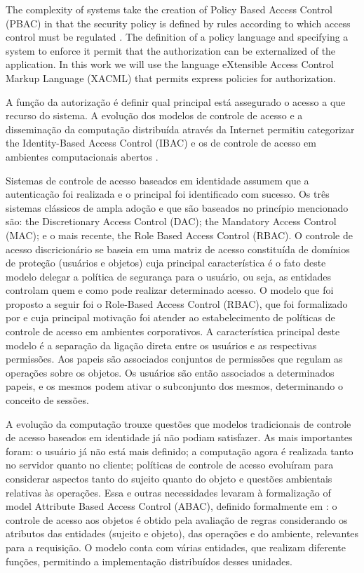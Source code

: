 \documentclass{doublecol-new}
\begin{document}
The complexity of systems take the creation of Policy Based Access Control (PBAC) in that the security policy is defined by rules according to which access control must be regulated \citep{samarati2001access}. The definition of a policy language and specifying a system to enforce it permit that the authorization can be externalized of the application. In this work we will use the language eXtensible Access Control Markup Language (XACML)\cite{rissanen2013extensible} that permits express policies for authorization.

A função da autorização é definir qual principal está assegurado o acesso a que recurso do sistema. A evolução dos modelos de controle de acesso e a disseminação da computação distribuída através da Internet permitiu categorizar the Identity-Based Access Control (IBAC) e os de controle de acesso em ambientes computacionais abertos \cite{gollmann2011compsecurity}.

Sistemas de controle de acesso baseados em identidade assumem que a autenticação foi realizada e o principal foi identificado com sucesso. Os três sistemas clássicos de ampla adoção e que são baseados no princípio mencionado são: the Discretionary Access Control (DAC); the Mandatory Access Control (MAC); e o mais recente, the Role Based Access Control (RBAC). O controle de acesso discricionário \cite{lampson1974protection} se baseia em uma matriz de acesso constituída de domínios de proteção (usuários e objetos) cuja principal característica é o fato deste modelo delegar a política de segurança para o usuário, ou seja, as entidades controlam quem e como pode realizar determinado acesso. O modelo que foi proposto a seguir foi o Role-Based Access Control (RBAC), que foi formalizado por \cite{ferraiolo1992role} e cuja principal motivação foi atender ao estabelecimento de políticas de controle de acesso em ambientes corporativos. A característica principal deste modelo é a separação da ligação direta entre os usuários e as respectivas permissões. Aos papeis são associados conjuntos de permissões que regulam as operações sobre os objetos. Os usuários são então associados a determinados papeis, e os mesmos podem ativar o subconjunto dos mesmos, determinando o conceito de sessões.

A evolução da computação trouxe questões que modelos tradicionais de controle de acesso baseados em identidade já não podiam satisfazer. As mais importantes foram: o usuário já não está mais definido; a computação agora é realizada tanto no servidor quanto no cliente; políticas de controle de acesso evoluíram para considerar aspectos tanto do sujeito quanto do objeto e questões ambientais relativas às operações. Essa e outras necessidades levaram à formalização of model Attribute Based Access Control (ABAC), definido formalmente em \cite{huABAC2014guide}: o controle de acesso aos objetos é obtido pela avaliação de regras considerando os atributos das entidades (sujeito e objeto), das operações e do ambiente, relevantes para a requisição. O modelo conta com várias entidades, que realizam diferente funções, permitindo a implementação distribuídos desses unidades.
\end{document}
